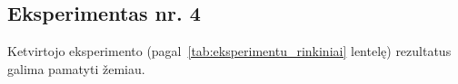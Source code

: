 \subsection{Eksperimentas nr. 4}
\label{subsec:eksperimentas_nr_4}

Ketvirtojo eksperimento (pagal~\ref{tab:eksperimentu_rinkiniai} lentelę) rezultatus galima pamatyti žemiau.


